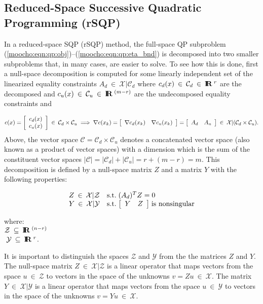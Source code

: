 \documentclass[pdf,ps2pdf,11pt]{SANDreport}
\begin{document}
{%
\subsection{Reduced-Space Successive Quadratic Programming (rSQP)}
\label{moocho:sec:rSQP}
%

In a reduced-space SQP (rSQP) method, the full-space QP subproblem
(\ref{moocho:eqn:qp:obj})--(\ref{moocho:eqn:qp:eta_bnd}) is decomposed
into two smaller subproblems that, in many cases, are easier to solve.
To see how this is done, first a null-space decomposition
\cite[Section 18.3]{ref:nocedal_wright_1999}
is computed for some linearly independent set of the
linearized equality constraints $A_d \:\in\:\mathcal{X}|\mathcal{C}_d$
where $c_d(x)\:\in\:\mathcal{C}_d\:\in\:\mbox{\textbf{I}}\hspace{-0.6ex}\mbox{\textbf{R}}\:^{r}$ are the decomposed
and $c_u(x)\:\in\:\mathcal{C}_u\:\in\:\mbox{\textbf{I}}\hspace{-0.6ex}\mbox{\textbf{R}}\:^{(m-r)}$ are the
undecomposed equality constraints and

{\bsinglespace
\begin{equation}
c(x) =
{\bmat{c} c_d(x) \\ c_u(x) \emat} \:\in\:\mathcal{C}_d \times \mathcal{C}_u
\; \Longrightarrow \;
\nabla c(x_k) = {\bmat{cc} \nabla c_d(x_k) & \nabla c_u(x_k) \emat}
= {\bmat{cc} A_d & A_u \emat} \:\in\:\mathcal{X}|(\mathcal{C}_d \times \mathcal{C}_u).
\label{moocho:eqn:lin_indep_constr}
\end{equation}
\esinglespace}
%
Above, the vector space $\mathcal{C} = \mathcal{C}_d \times \mathcal{C}_u$ denotes a concatenated vector space
(also known as a product of vector spaces) with a dimension which is the sum of the constituent vector spaces
$|\mathcal{C}| = |\mathcal{C}_d| + |\mathcal{C}_u| = r + (m - r) = m$.
This decomposition is defined by a null-space matrix $Z$ and a matrix $Y$ with the following properties:

{\bsinglespace
\begin{equation}
\begin{array}{ll}
Z \:\in\:\mathcal{X}|\mathcal{Z}
	& \mbox{s.t.} \; (A_d)^T Z = 0 \\
Y \:\in\:\mathcal{X}|\mathcal{Y}
	& \mbox{s.t.} \; {\bmat{cc} Y & Z \emat} \; \mbox{is nonsingular}
\end{array}
\label{moocho:eqn:Z_Y_def}
\end{equation}
\begin{tabbing}
\hspace{4ex}where:\hspace{5ex}\= \\
\>	$\mathcal{Z} \:\subseteq\:\mbox{\textbf{I}}\hspace{-0.6ex}\mbox{\textbf{R}}\:^{(n-r)}$ \\
\>	$\; \mathcal{Y} \:\subseteq\:\mbox{\textbf{I}}\hspace{-0.6ex}\mbox{\textbf{R}}\:^{r}$.
\end{tabbing}
\esinglespace}
%
It is important to distinguish the spaces $\mathcal{Z}$ and $\mathcal{Y}$ from the the
matrices $Z$ and $Y$.  The null-space matrix $Z\:\in\:\mathcal{X}|\mathcal{Z}$
is a linear operator that maps vectors from the space $u\:\in\:\mathcal{Z}$ to vectors in the space
of the unknowns $v = Z u \:\in\:\mathcal{X}$.  The matrix $Y\:\in\:\mathcal{X}|\mathcal{Y}$
is a linear operator that maps vectors from the space $u\:\in\:\mathcal{Y}$ to vectors in the space
of the unknowns $v = Y u \:\in\:\mathcal{X}$.

}
\end{document}
